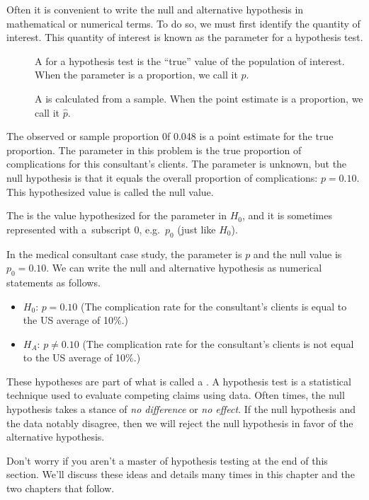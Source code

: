 Often it is convenient to write the null and alternative hypothesis in mathematical or numerical terms. To do so, we must first identify the quantity of interest. This quantity of interest is known as the parameter for a hypothesis test.

\begin{termBox}{
\vspace{-5mm}
\begin{description}
\item[] A  for a hypothesis test is the ``true'' value of the population of interest. When the parameter is a proportion, we call it $p$.
\item[] A  is calculated from a sample. When the point estimate is a proportion, we call it $\hat{p}$.
\end{description}
}
\end{termBox}

The observed or sample proportion 0f 0.048 is a point estimate for the true proportion. The parameter in this problem is the true proportion of complications for this consultant's clients. The parameter is unknown, but the null hypothesis is that it equals the overall proportion of complications: $p = 0.10$. This hypothesized value is called the null value.

\begin{termBox}{
The  is the value hypothesized for the parameter in $H_0$, and it is sometimes represented with a~subscript 0, e.g.~$p_0$ (just like $H_0$).}
\end{termBox}

In the medical consultant case study, the parameter is $p$ and the null value is $p_0 = 0.10$. We can write the null and alternative hypothesis as numerical statements as follows.
\begin{itemize}
\item $H_0$: $p=0.10$ (The complication rate for the consultant's clients is equal to the US average of 10\%.)
\item $H_A$: $p \neq 0.10$ (The complication rate for the consultant's clients is not equal to the US average of 10\%.)
\end{itemize}

\begin{termBox}{
These hypotheses are part of what is called a . A hypothesis test is a statistical technique used to evaluate competing claims using data. Often times, the null hypothesis takes a stance of \emph{no difference} or \emph{no effect}. If the null hypothesis and the data notably disagree, then we will reject the null hypothesis in favor of the alternative hypothesis.\vspace{3mm}

Don't worry if you aren't a master of hypothesis testing at the end of this section. We'll discuss these ideas and details many times in this chapter and the two chapters that follow.}
\end{termBox}

